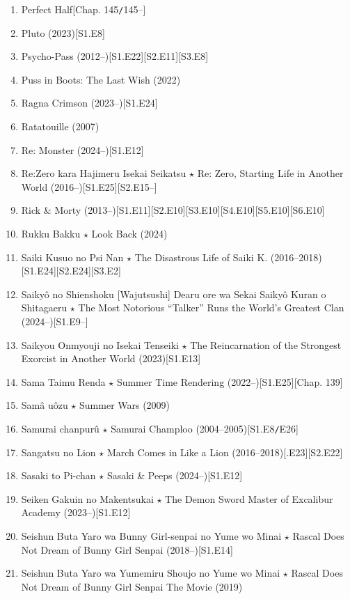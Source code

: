 \documentclass{article}
\begin{document}
\begin{enumerate}
    \item Perfect Half\hfill[Chap. 145{\tt/}145--]
    \item {\sc Pluto} (2023)\hfill[S1.E8]
    \item {\sc Psycho-Pass} (2012--)\hfill[S1.E22][S2.E11][S3.E8]
    \item {\sc Puss in Boots: The Last Wish} (2022)
    \item {\sc Ragna Crimson} (2023--)\hfill[S1.E24]
    \item {\sc Ratatouille} (2007)
    \item {\sc Re: Monster} (2024--)\hfill[S1.E12]
    \item Re:Zero kara Hajimeru Isekai Seikatsu $\star$ Re: Zero, Starting Life in Another World (2016--)\hfill[S1.E25][S2.E15--]
    \item Rick \& Morty (2013--)\hfill[S1.E11][S2.E10][S3.E10][S4.E10][S5.E10][S6.E10]
    \item {\sc Rukku Bakku $\star$ Look Back} (2024)
    \item {\sc Saiki Kusuo no Psi Nan $\star$ The Disastrous Life of Saiki K.} (2016--2018)\hfill[S1.E24][S2.E24][S3.E2]
    \item Saikyô no Shienshoku [Wajutsushi] Dearu ore wa Sekai Saikyô Kuran o Shitagaeru $\star$ The Most Notorious ``Talker'' Runs the World's Greatest Clan (2024--)\hfill[S1.E9--]
    \item {\sc Saikyou Onmyouji no Isekai Tenseiki $\star$ The Reincarnation of the Strongest Exorcist in Another World} (2023)\hfill[S1.E13]
    \item {\sc Sama Taimu Renda $\star$ Summer Time Rendering} (2022--)\hfill[S1.E25][Chap. 139]
    \item {\sc Samâ uôzu $\star$ Summer Wars} (2009)
    \item Samurai chanpurû $\star$ Samurai Champloo (2004--2005)\hfill[S1.E8{\tt/}E26]
    \item {\sc Sangatsu no Lion $\star$ March Comes in Like a Lion} (2016--2018)\hfill[.E23][S2.E22]
    \item {\sc Sasaki to Pi-chan $\star$ Sasaki \& Peeps} (2024--)\hfill[S1.E12]
    \item {\sc Seiken Gakuin no Makentsukai $\star$ The Demon Sword Master of Excalibur Academy} (2023--)\hfill[S1.E12]
    \item {\sc Seishun Buta Yaro wa Bunny Girl-senpai no Yume wo Minai $\star$ Rascal Does Not Dream of Bunny Girl Senpai} (2018--)\hfill[S1.E14]
    \item {\sc Seishun Buta Yaro wa Yumemiru Shoujo no Yume wo Minai $\star$ Rascal Does Not Dream of Bunny Girl Senpai The Movie} (2019)

\end{enumerate}
\end{document}
